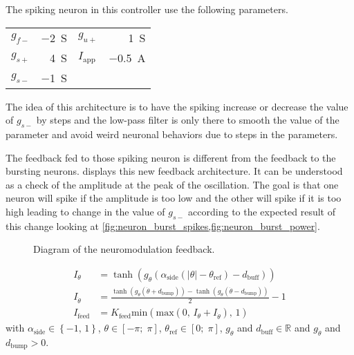 The spiking neuron in this controller use the following parameters.
{

\large\centering
\begin{tabular}{lr|lr}
    $g_{f-}$    & \qty{-2}{\siemens}   & $g_{u+}$          & \qty{1}{\siemens}\\
    $g_{s+}$    & \qty{4}{\siemens}    & $I_\text{app}$    & \qty{-0.5}{\ampere}\\
    $g_{s-}$    & \qty{-1}{\siemens} & & 
\end{tabular}

}

The idea of this architecture is to have the spiking increase or decrease the value of $g_{s-}$ by steps and the low-pass filter is only there to smooth the value of the parameter and avoid weird neuronal behaviors due to steps in the parameters.

The feedback fed to those spiking neuron is different from the feedback to the bursting neurons. 
 displays this new feedback architecture. 
It can be understood as a check of the amplitude at the peak of the oscillation.
The goal is that one neuron will spike if the amplitude is too low and the other will spike if it is too high leading to change in the value of $g_{s-}$ according to the expected result of this change looking at \cref{fig:neuron_burst_spikes,fig:neuron_burst_power}.
\begin{figure}[!htbp]
    \centering
    \caption{Diagram of the neuromodulation feedback.}
    \label{fig:neuro_feed}
\end{figure}

\begin{align}
    I_\theta &= \tanh\left(g_\theta\left(\alpha_\text{side}\left(\left|\theta\right| - \theta_\text{ref}\right) - d_\text{buff}\right)\right)\\
    I_{\dot{\theta}} &= \frac{\tanh\left(g_{\dot{\theta}}\left(\dot{\theta}+d_\text{bump}\right)\right) -\tanh\left(g_{\dot{\theta}}\left(\dot{\theta}-d_\text{bump}\right)\right)}{2}-1\\
    I_\text{feed} &= K_\text{feed}\text{min}\left(\text{max}\left(0,\, I_\theta + I_{\dot{\theta}}\right),\, 1\right)
\end{align}
with $\alpha_\text{side} \in \left\{-1,\,1\right\}$, $\theta \in \left[-\pi;\;\pi\right]$, $\theta_\text{ref} \in \left[0;\;\pi\right]$, $g_\theta$ and $d_\text{buff} \in \mathbb{R}$ and $g_{\dot{\theta}}$ and $d_\text{bump} > 0$.

